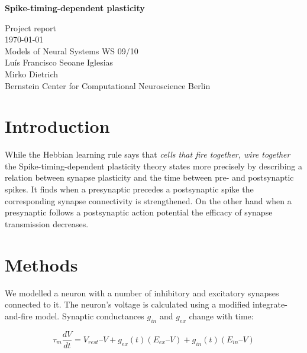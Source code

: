 \documentclass[a4paper,12pt,oneside]{article}
\begin{document}
\begin{titlepage}
\begin{center}
\begin{spacing}{2}
{\huge\bf Spike-timing-dependent plasticity} \\
\end{spacing}
\Large
Project report \\
\vfill
\normalsize
\today \\
\vspace{5em}
Models of Neural Systems WS 09/10 \\
\vspace{1em}
Luís Francisco Seoane Iglesias \\
Mirko Dietrich \\
\vspace{1em}
Bernstein Center for Computational Neuroscience Berlin
\end{center}
\end{titlepage}

\tableofcontents

\newpage

\section{Introduction}

While the Hebbian learning rule says that \textit{cells that fire
  together, wire together} the Spike-timing-dependent plasticity
theory states more precisely by describing a relation between synapse
plasticity and the time between pre- and postsynaptic spikes. It finds
when a presynaptic precedes a postsynaptic spike the corresponding
synapse connectivity is strengthened. On the other hand when a
presynaptic follows a postsynaptic action potential the efficacy of
synapse transmission decreases.\cite{Song:2000}

\section{Methods}

We modelled a neuron with a number of inhibitory and excitatory
synapses connected to it. The neuron's voltage is calculated using a
modified integrate-and-fire model. Synaptic conductances $g_{in}$ and
$g_{ex}$ change with time:

\[
\tau_m \frac{dV}{dt} = V_{rest} – V + g_{ex}(t)(E_{ex} – V) + g_{in}(t)(E_{in} – V)
\]
\end{document}
